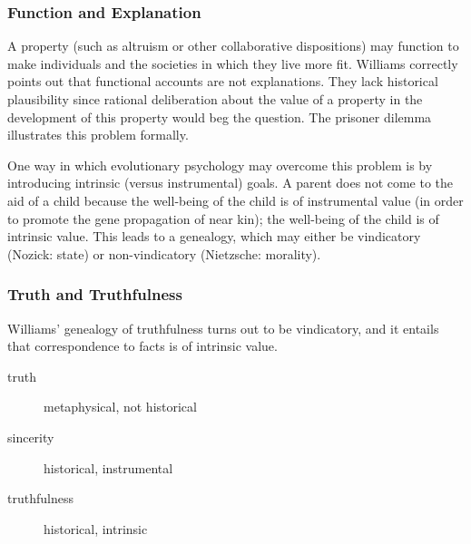 \documentclass[xcolor=dvipsnames]{beamer}
\begin{document}
\begin{frame}
  \frametitle{Function and Explanation}
  A property (such as altruism or other collaborative dispositions)
  may function to make individuals and the societies in which they
  live more fit. Williams correctly points out that functional
  accounts are not explanations. They lack historical plausibility
  since rational deliberation about the value of a property in the
  development of this property would beg the question. The prisoner
  dilemma illustrates this problem formally.

  \bigskip

  One way in which evolutionary psychology may overcome this problem
  is by introducing intrinsic (versus instrumental) goals. A parent
  does not come to the aid of a child because the well-being of the
  child is of instrumental value (in order to promote the gene
  propagation of near kin); the well-being of the child is of
  intrinsic value. This leads to a genealogy, which may either be
  vindicatory (Nozick: state) or non-vindicatory (Nietzsche:
  morality). 
\end{frame}

\begin{frame}
  \frametitle{Truth and Truthfulness}
  Williams' genealogy of truthfulness turns out to be vindicatory, and
  it entails that correspondence to facts is of intrinsic value.
  \begin{description}
  \item[truth] metaphysical, not historical
  \item[sincerity] historical, instrumental
  \item[truthfulness] historical, intrinsic
  \end{description}
\end{frame}
\end{document}
